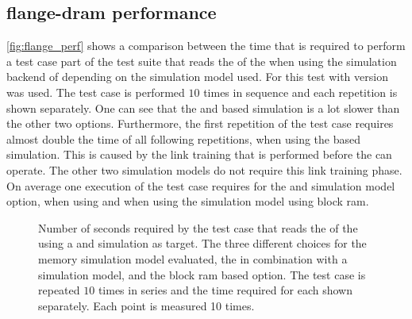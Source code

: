 \subsection{flange-dram performance}
\autoref{fig:flange_perf} shows a comparison between the time that is required to perform a test case part of the \hxcomm{} test suite that reads the \JTAGID{} of the \ASIC{} when using the simulation backend of \hxcomm{} depending on the \AXI{} \DDR{} simulation model used. For this test \xcelium{} with version \xceliumVer{} was used. The test case is performed $\num{10}$ times in sequence and each repetition is shown separately. One can see that the \XilinxMIG{} and \DDR{} based simulation is a lot slower than the other two options. Furthermore, the first repetition of the test case requires almost double the time of all following repetitions, when using the \XilinxMIG{} based simulation. This is caused by the link training that is performed before the \XilinxMIG{} can operate. The other two simulation models do not require this link training phase. On average one execution of the test case requires  for the \XilinxMIG{} and \DDR{} simulation model option,  when using \flangedram{} and  when using the simulation model using block ram.


\begin{figure}[H]
\caption{Number of seconds required by the \hxcomm{} test case that reads the \JTAGID{} of the \ASIC{} using a \FPGA{} and \ASIC{} simulation as target. The three different choices for the \AXI{} \DDR{} memory simulation model evaluated, the \XilinxMIG{} in combination with a \DDR{} simulation model, \flangedram{} and the block ram based option. The \hxcomm{} test case is repeated $\num{10}$ times in series and the time required for each shown separately. Each point is measured 10 times.}\label{fig:flange_perf}
\end{figure}

